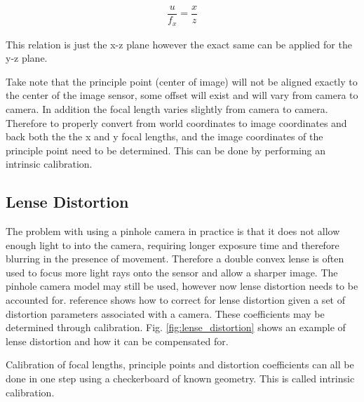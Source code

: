 \begin{align}
  \dfrac{u}{f_x} = \dfrac{x}{z}
\end{align}

This relation is just the x-z plane however the exact same can be applied for the y-z plane.   

Take note that the principle point (center of image) will not be aligned exactly to the center of the image sensor, some offset will exist and will vary from camera to camera.  In addition the focal length varies slightly from camera to camera.  Therefore to properly convert from world coordinates to image coordinates and back both the the x and y focal lengths, and the image coordinates of the principle point need to be determined.  This can be done by performing an intrinsic calibration.\cite{camera_model}

\subsection{Lense Distortion}
\label{subsec:lense_distortion}

The problem with using a pinhole camera in practice is that it does not allow enough light to into the camera, requiring longer exposure time and therefore blurring in the presence of movement. Therefore a double convex lense is often used to focus more light rays onto the sensor and allow a sharper image.  The pinhole camera model may still be used, however now lense distortion needs to be accounted for.  reference shows how to correct for lense distortion given a set of distortion parameters associated with a camera.  These coefficients may be determined through calibration.  Fig. \ref{fig:lense_distortion} shows an example of lense distortion and how it can be compensated for.

Calibration of focal lengths, principle points and distortion coefficients can all be done in one step using a checkerboard of known geometry.  This is called intrinsic calibration.\cite{devernay_01}


